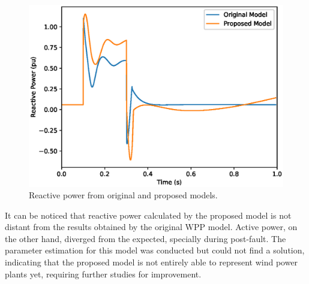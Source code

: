 \begin{figure}[!h]
	\centering
	\includegraphics[scale=.7]{Images/Q_proposed.eps}
	\caption{Reactive power from original and proposed models.}		
	\label{fig: proposed_Q}
\end{figure}

It can be noticed that reactive power calculated by the proposed model is not distant from the results obtained by the original WPP model. Active power, on the other hand, diverged from the expected, specially during post-fault. The parameter estimation for this model was conducted but could not find a solution, indicating that the proposed model is not entirely able to represent wind power plants yet, requiring further studies for improvement.